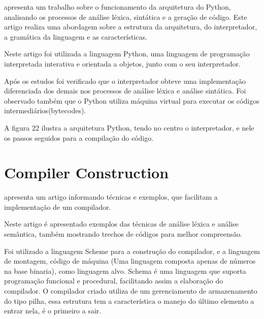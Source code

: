 \documentclass[12pt,oneside,a4paper,chapter=TITLE,section=TITLE,sumario=tradicional]{abntex2}
\begin{document}
\cite{eduardo2010} apresenta um trabalho sobre o funcionamento da arquitetura do Python, analisando os processos de análise léxica, sintática e a geração de código. Este artigo realiza uma abordagem sobre a estrutura da arquitetura, do interpretador, a gramática da linguagem e as características.
 
Neste artigo foi utilizada a linguagem Python, uma linguagem de programação interpretada interativa e orientada a objetos, junto com o seu interpretador.

Após os estudos foi verificado que o interpretador obteve uma implementação diferenciada dos demais nos processos de análise léxica e análise sintática. Foi observado também que o Python utiliza máquina virtual para executar os códigos intermediários(bytecodes).

A figura 22 ilustra a arquitetura Python, tendo no centro o interpretador, e nele os passos seguidos para a compilação do código.

\begin{figure}[htb]
\end{figure}

\section{ Compiler Construction}
\label{sec:compiler-construction}

\cite{aastha2013} apresenta um artigo informando técnicas e exemplos, que facilitam a implementação de um compilador. 

Neste artigo é apresentado exemplos das técnicas de análise léxica e análise semântica, também mostrando trechos de códigos para melhor compreensão.

Foi utilizado a linguagem Scheme para a construção do compilador, e a linguagem de montagem, código de máquina (Uma linguagem composta apenas de números na base binaria), como linguagem alvo. Schema é uma linguagem que suporta programação funcional e procedural, facilitando assim a elaboração do compilador. O compilador criado utiliza de um gerenciamento de armazenamento do tipo pilha, essa estrutura tem a característica o manejo do último elemento a entrar nela, é o primeiro a sair.
\end{document}
